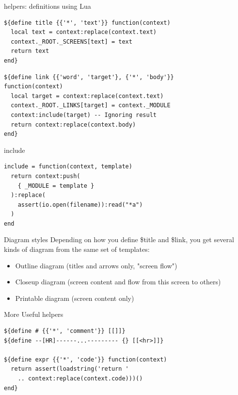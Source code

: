 \documentclass[aspectratio=43,handout,bigger]{beamer}
\begin{document}

\begin{frame}[fragile]{helpers: definitions using Lua}
\begin{verbatim}
${define title {{'*', 'text'}} function(context)
  local text = context:replace(context.text)
  context._ROOT._SCREENS[text] = text
  return text
end}
\end{verbatim}

\begin{verbatim}
${define link {{'word', 'target'}, {'*', 'body'}}
function(context)
  local target = context:replace(context.text)
  context._ROOT._LINKS[target] = context._MODULE
  context:include(target) -- Ignoring result
  return context:replace(context.body)
end}
\end{verbatim}
\end{frame}


\begin{frame}[fragile]{include}
\begin{verbatim}
include = function(context, template)
  return context:push(
    { _MODULE = template }
  ):replace(
    assert(io.open(filename)):read("*a")
  )
end
\end{verbatim}
\end{frame}


\begin{frame}{Diagram styles}
  Depending on how you define \${title} and \${link},
  you get several kinds of diagram from the same set of templates:

  \begin{itemize}
    \item Outline diagram (titles and arrows only, "screen flow")
    \item Closeup diagram (screen content and flow from this screen to others)
    \item Printable diagram (screen content only)
  \end{itemize}
\end{frame}


\begin{frame}[fragile]{More Useful helpers}
\begin{verbatim}
${define # {{'*', 'comment'}} [[]]}
${define --[HR]------...--------- {} [[<hr>]]}

${define expr {{'*', 'code'}} function(context)
  return assert(loadstring('return '
    .. context:replace(context.code)))()
end}
\end{verbatim}
\end{frame}
\end{document}
